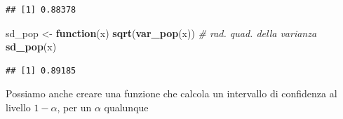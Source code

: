 \documentclass[
  11pt,
]{book}
\newenvironment{Shaded}{\begin{snugshade}}{\end{snugshade}}
\newcommand{\CommentTok}[1]{\textcolor[rgb]{0.56,0.35,0.01}{\textit{#1}}}
\newcommand{\ControlFlowTok}[1]{\textcolor[rgb]{0.13,0.29,0.53}{\textbf{#1}}}
\newcommand{\FunctionTok}[1]{\textcolor[rgb]{0.13,0.29,0.53}{\textbf{#1}}}
\newcommand{\NormalTok}[1]{#1}
\newcommand{\OtherTok}[1]{\textcolor[rgb]{0.56,0.35,0.01}{#1}}
\theoremstyle{mytheoremstyle}
\theoremstyle{mydefstyle}
\begin{document}
\begin{verbatim}
## [1] 0.88378
\end{verbatim}

\begin{Shaded}
\begin{Highlighting}[]
\NormalTok{sd\_pop }\OtherTok{\textless{}{-}} \ControlFlowTok{function}\NormalTok{(x) }\FunctionTok{sqrt}\NormalTok{(}\FunctionTok{var\_pop}\NormalTok{(x)) }\CommentTok{\# rad. quad. della varianza }
\FunctionTok{sd\_pop}\NormalTok{(x)}
\end{Highlighting}
\end{Shaded}

\begin{verbatim}
## [1] 0.89185
\end{verbatim}

Possiamo anche creare una funzione che calcola un intervallo di confidenza
al livello \(1-\alpha\), per un \(\alpha\) qualunque
\end{document}
